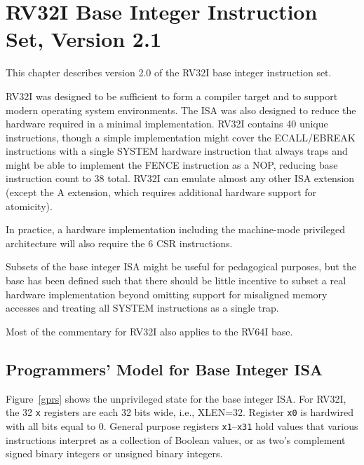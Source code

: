 \chapter{RV32I Base Integer Instruction Set, Version 2.1}
\label{rv32}

This chapter describes version 2.0 of the RV32I base integer
instruction set.

\begin{commentary}
RV32I was designed to be sufficient to form a compiler target and to
support modern operating system environments.  The ISA was also
designed to reduce the hardware required in a minimal implementation.
RV32I contains 40 unique instructions, though a simple implementation
might cover the ECALL/EBREAK instructions with a single SYSTEM
hardware instruction that always traps and might be able to implement
the FENCE instruction as a NOP, reducing base instruction count to 38
total.  RV32I can emulate almost any other ISA extension (except the A
extension, which requires additional hardware support for atomicity).

In practice, a hardware implementation including the machine-mode
privileged architecture will also require the 6 CSR instructions.

Subsets of the base integer ISA might be useful for pedagogical
purposes, but the base has been defined such that there should be
little incentive to subset a real hardware implementation beyond
omitting support for misaligned memory accesses and treating all
SYSTEM instructions as a single trap.
\end{commentary}

\begin{commentary}
Most of the commentary for RV32I also applies to the RV64I base.
\end{commentary}

\section{Programmers' Model for Base Integer ISA}

Figure~\ref{gprs} shows the unprivileged state for the base integer
ISA.  For RV32I, the 32 {\tt x} registers are each 32 bits wide, i.e.,
XLEN=32.  Register {\tt x0} is hardwired with all bits equal to 0.
General purpose registers {\tt x1}--{\tt x31} hold values that various
instructions interpret as a collection of Boolean values, or as two's
complement signed binary integers or unsigned binary integers.

